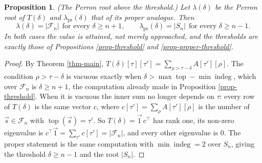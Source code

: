\documentclass[11pt, a4paper, abstract=yes]{scrartcl}
\theoremstyle{definition}
\theoremstyle{remark}
\theoremstyle{plain}
\newtheorem{proposition}[definition]{Proposition}
\newcommand{\indeg}{\operatorname{indeg}}
\newcommand{\tp}{\operatorname{top}}
\begin{document}
\begin{proposition}
(\emph{The Perron root above the threshold.}) Let \(\lambda(\delta)\) be the Perron root of \(T(\delta)\)
and \(\lambda_{\mathrm{pr}}(\delta)\) that of its proper analogue. Then
\begin{equation}\label{eq:perron-threshold}
  \lambda(\delta)=\lvert\mathcal F_n\rvert\ \ \text{for every }\delta\ge n+1,
  \qquad
  \lambda_{\mathrm{pr}}(\delta)=\lvert S_n\rvert\ \ \text{for every }\delta\ge n-1 .
\end{equation}
In both cases the value is attained, not merely approached, and the thresholds are exactly those of
Propositions \ref{prop-threshold} and \ref{prop-proper-threshold}.
\label{prop-perron-threshold}
\end{proposition}

\begin{proof}
By Theorem \ref{thm-main}, \(T(\delta)[\tau][\tau']=\sum_{\rho>\tau-\delta}A[\tau'][\rho]\). The
condition \(\rho>\tau-\delta\) is vacuous exactly when \(\delta>\max\tp-\min\indeg\), which over
\(\mathcal F_n\) is \(\delta\ge n+1\), the computation already made in
Proposition \ref{prop-threshold}. When it is vacuous the inner sum no longer depends on \(\tau\):
every row of \(T(\delta)\) is the same vector \(c\), where \(c[\tau']=\sum_\rho A[\tau'][\rho]\) is
the number of \(\vec s\in\mathcal F_n\) with \(\tp(\vec s)=\tau'\). So \(T(\delta)=\vec1\,c^{\!\top}\)
has rank one, its non-zero eigenvalue is \(c^{\!\top}\vec1=\sum_{\tau'}c[\tau']=|\mathcal F_n|\), and
every other eigenvalue is \(0\). The proper statement is the same computation with \(\min\indeg=2\)
over \(S_n\), giving the threshold \(\delta\ge n-1\) and the root \(|S_n|\).
\end{proof}
\end{document}
